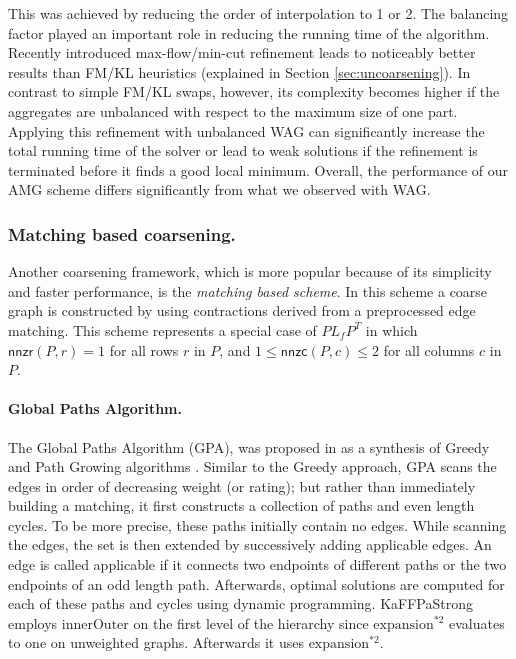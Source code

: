 \documentclass{llncs}
\newcommand{\innerOuter}{\mathrm{innerOuter}}
\newcommand{\expansion}{\mathrm{expansion}}
\newcommand{\nnzr}{\textsf{nnzr}}
\newcommand{\nnzc}{\textsf{nnzc}}
\begin{document}
  This was achieved by reducing the order of interpolation to 1 or 2. 
  The balancing factor played an important role in reducing the running time of the algorithm. 
  Recently introduced max-flow/min-cut refinement leads to noticeably better results than FM/KL heuristics (explained in Section \ref{sec:uncoarsening}). In contrast to simple FM/KL swaps, however, its complexity becomes higher if the aggregates are unbalanced with respect to the maximum size of one part. Applying this refinement with unbalanced WAG can significantly increase the total running time of the solver or lead to weak solutions if the refinement is terminated before it finds a good local minimum. Overall, the performance of our AMG scheme differs significantly from what we observed with WAG.


\subsubsection{Matching based coarsening.}
\par Another coarsening framework, which is more popular because of its simplicity and faster performance, is the \emph{matching based scheme}. 
 In this scheme a coarse graph is constructed by using contractions derived from a preprocessed edge matching. This scheme represents a special case of $PL_fP^T$ in which $\nnzr(P,r)=1$ for all rows $r$ in $P$, and $1\leq \nnzc(P,c)\leq 2$ for all columns $c$ in $P$.
\paragraph{Global Paths Algorithm.}
The Global Paths Algorithm (GPA), was proposed in \cite{MauSan07} as a synthesis of Greedy and Path Growing algorithms \cite{DH03a}. 
Similar to the Greedy approach, GPA scans the edges in order of decreasing weight (or rating); 
but rather than immediately building a matching, it first constructs a collection
of paths and even length cycles. To be more precise, these paths initially contain no edges. 
While scanning the edges, 
the set is then extended by successively adding applicable edges. An edge is called applicable if it connects two endpoints of different paths or the two endpoints of an odd length path. Afterwards, optimal solutions are computed for each of these paths and cycles using dynamic programming. 
KaFFPaStrong \cite{kaffpa} employs $\innerOuter$ on the first level of the hierarchy since $\expansion^{*2}$ evaluates to one on unweighted graphs. Afterwards it uses $\expansion^{*2}$. 
\end{document}
